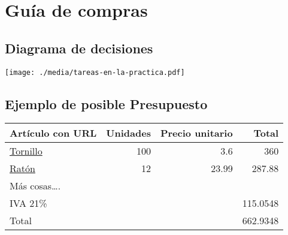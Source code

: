 \documentclass{article}
\renewcommand{\includegraphics}[2][]{\IfFileExists{#2.pdf}{\originalincludegraphics[#1]{#2.pdf}}{\originalincludegraphics[#1]{#2}}}
\begin{document}
\section{Guía de compras}
\label{sec:org0000015}

\subsection{Diagrama de decisiones}
\label{sec:org000000f}
\begin{center}
\texttt{[image: ./media/tareas-en-la-practica.pdf]}
\end{center}

\subsection{Ejemplo de posible Presupuesto}
\label{sec:org0000012}
\begin{center}
\begin{tabular}{lrrr}
Artículo con URL & Unidades & Precio unitario & Total\\
\hline
\href{https://www.tornillos-online.com/975a2es.html}{Tornillo} & 100 & 3.6 & 360\\
\href{https://www.pccomponentes.com/hp-pavilion-200-raton-gaming-3200-dpi}{Ratón} & 12 & 23.99 & 287.88\\
Más cosas\ldots{}. &  &  & \\
\hline
IVA 21\% &  &  & 115.0548\\
Total &  &  & 662.9348\\
\hline
\end{tabular}
\end{center}
\end{document}
